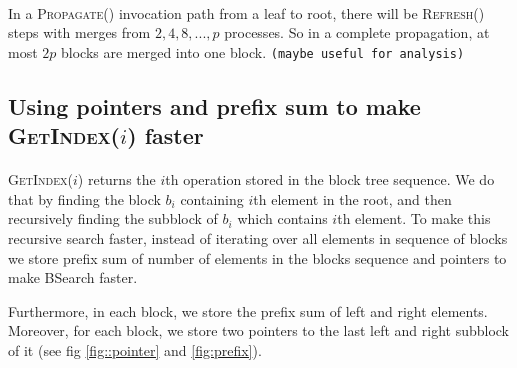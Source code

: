 \documentclass[10pt]{article}
\newtheorem{lemma}[theorem]{Lemma}
\theoremstyle{definition}
\newtheorem{definition}[theorem]{Definition}
\begin{document}
\paragraph{}
In a \textsc{Propagate}() invocation path from a leaf to root, there will be \textsc{Refresh}() steps with merges from $2, 4, 8, ..., p$ processes. So in a complete propagation, at most $2p$ blocks are merged into one block. \texttt{(maybe useful for analysis)}

\subsection{Using pointers and prefix sum to make \textsc{GetIndex}($i$) faster}
\paragraph{}
\textsc{GetIndex}($i$) returns the $i$th operation stored in the block tree sequence. We do that by finding the block $b_i$ containing $i$th element in the root, and then recursively finding the subblock of $b_i$ which contains $i$th element. To make this recursive search faster, instead of iterating over all elements in sequence of blocks we store prefix sum of number of elements in the blocks sequence and pointers to make BSearch faster.

Furthermore, in each block, we store the prefix sum of left and right elements. Moreover, for each block, we store two pointers to the last left and right subblock of it (see fig \ref{fig::pointer} and \ref{fig:prefix}).
\end{document}
